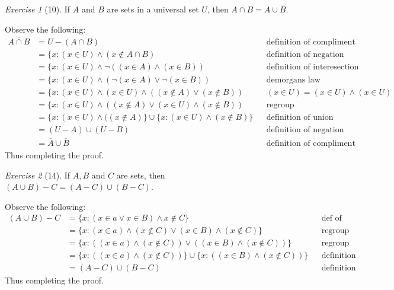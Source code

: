 \documentclass[12pt]{amsart}
\makeatletter
\theoremstyle{remark}
\newtheorem*{exercise}{Exercise}%
\renewenvironment{proof}[1][\proofname]{\par\doublespacing
  \pushQED{\qed}%
  \normalfont \topsep6\p@\@plus6\p@\relax
  \list{}{%
    \settowidth{\leftmargin}{\itshape\proofname:\hskip\labelsep}%
    \setlength{\labelwidth}{0pt}%
    \setlength{\itemindent}{-\leftmargin}%
  }%
  \item[\hskip\labelsep\itshape#1\@addpunct{:}]\ignorespaces
}{%
  \popQED\endlist\@endpefalse
  \singlespacing
}
\theoremstyle{mycomment}
\makeatother
\begin{document}
\begin{exercise}[10] If $A$ and $B$ are sets in a universal set $U$, then $\overline{A\cap B}=\overline A\cup \overline B$.
\begin{proof} Observe the following:
  \begin{align*}
    \overline{A \cap B} &= U - (A \cap B) && \text{definition of compliment} \\
                        &= \{x : (x \in U) \land (x \notin A \cap B) && \text{definition of negation} \\
                        &= \{x : (x \in U) \land \neg ((x \in A) \land (x \in B)) && \text{definition of interesection} \\
                        &= \{x : (x \in U) \land (\neg(x \in A) \lor \neg(x \in B)) && \text{demorgans law} \\
                        &= \{x : (x \in U) \land (x \in U) \land ((x \notin A) \lor (x \notin B)) && (x \in U) = (x\in U) \land (x \in U) \\
                        &= \{x : (x \in U) \land ((x \notin A) \lor (x \in U) \land (x \notin B)) && \text{regroup} \\
                        &= \{x : (x \in U) \land ((x \notin A)\} \cup \{x: (x \in U) \land (x \notin B)\} && \text{definition of union} \\
                        &= (U - A) \cup (U - B) && \text{definition of negation} \\
                        &= \overline{A} \cup \overline{B} && \text{definition of compliment}
  \end{align*}
  Thus completing the proof.
\end{proof}
\end{exercise}

\begin{exercise}[14] If $A,B$ and $C$ are sets, then $(A\cup B)-C=(A-C)\cup (B-C)$.
\begin{proof} Observe the following:
  \begin{align*}
    (A \cup B) - C &= \{x: (x \in a \lor x \in B) \land x \notin C \} && \text{def of union and negation} \\ 
                   &= \{x: (x \in a) \land (x \notin C) \lor (x \in B) \land (x \notin C) \} && \text{regroup} \\
                   &= \{x: ((x \in a) \land (x \notin C)) \lor ((x \in B) \land (x \notin C)) \} && \text{regroup} \\ 
                   &= \{x: ((x \in a) \land (x \notin C))\} \cup \{x: ((x \in B) \land (x \notin C)) \} && \text{definition of union} \\
                   &= (A - C) \cup (B - C) && \text{definition of negation}
  \end{align*}
  Thus completing the proof.
\end{proof}
\end{exercise}
\end{document}
